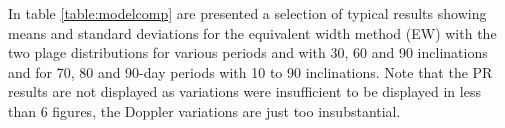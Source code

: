 In table \ref{table:modelcomp} are presented a selection of typical results showing means and standard deviations
for the equivalent width method (EW) with the two plage distributions for various periods and with 30{\degree},
60{\degree} and 90{\degree} inclinations and for 70, 80 and 90-day periods with 10{\degree} to 90{\degree} inclinations.
Note that the PR results are not displayed as variations were insufficient to be displayed in less than 6 figures, the
Doppler variations are just too insubstantial.

\begin{table}[!htbp]
\centering
{}

\vspace{5 mm}


\end{table}

